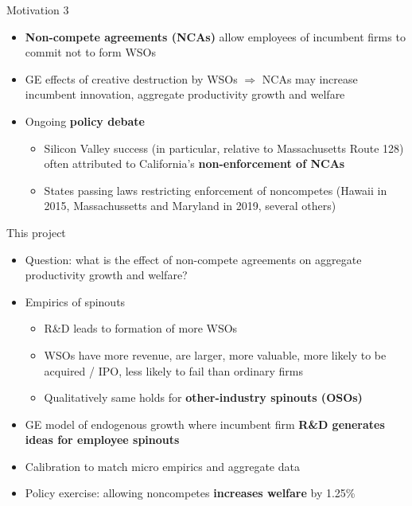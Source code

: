 \documentclass[english,usenames,dvipsnames]{beamer}
\begin{document}
\begin{frame}{Motivation 3}
\begin{itemize}
	\item \alert{\textbf{Non-compete agreements (NCAs)}} allow employees of incumbent firms to commit not to form WSOs
	\item GE effects of creative destruction by WSOs $\Rightarrow$ NCAs may increase incumbent innovation, aggregate productivity growth and welfare
	\item Ongoing \alert{\textbf{policy debate}}
	\begin{itemize}
		\item Silicon Valley success (in particular, relative to Massachusetts Route 128) often attributed to California's \alert{\textbf{non-enforcement of NCAs}}
		\item States passing laws restricting enforcement of noncompetes (Hawaii in 2015, Massachussetts and Maryland in 2019, several others)
	\end{itemize}
\end{itemize}
\end{frame}

\begin{frame}{This project}
\begin{itemize}
	\item Question: what is the effect of non-compete agreements on aggregate productivity growth and welfare?
	\item Empirics of spinouts
	\begin{itemize}
		\item R\&D leads to formation of more WSOs
		\item WSOs have more revenue, are larger, more valuable, more likely to be acquired / IPO, less likely to fail than ordinary firms
		\item Qualitatively same holds for \alert{\textbf{other-industry spinouts (OSOs)}}
	\end{itemize}
	\item GE model of endogenous growth where incumbent firm \alert{\textbf{R\&D generates ideas for employee spinouts}}
	\item Calibration to match micro empirics and aggregate data
	\item Policy exercise: allowing noncompetes \alert{\textbf{increases welfare}} by 1.25\% 
\end{itemize}
\end{frame}
\end{document}
